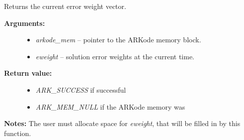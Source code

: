 \documentclass[letterpaper,10pt,english]{sphinxmanual}
\begin{document}
\begin{fulllineitems}
\label{c_interface/User_callable:c.ARKodeGetErrWeights}
Returns the current error weight vector.
\begin{description}
\item[{\textbf{Arguments:}}] \leavevmode\begin{itemize}
\item {} 
\emph{arkode\_mem} -- pointer to the ARKode memory block.

\item {} 
\emph{eweight} -- solution error weights at the current time.

\end{itemize}

\item[{\textbf{Return value:}}] \leavevmode\begin{itemize}
\item {} 
\emph{ARK\_SUCCESS} if successful

\item {} 
\emph{ARK\_MEM\_NULL} if the ARKode memory was 

\end{itemize}

\end{description}

\textbf{Notes:} The user must allocate space for \emph{eweight}, that will be
filled in by this function.

\end{fulllineitems}

\end{document}
